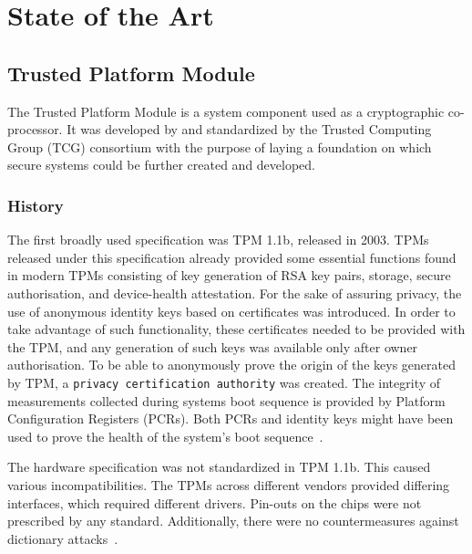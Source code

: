 \chapter{State of the Art}

\section{Trusted Platform Module}
The Trusted Platform Module is a system component used as a cryptographic co-processor. It was developed by and standardized by the Trusted Computing Group (TCG) consortium with the purpose of laying a foundation on which secure systems could be further created and developed. 

\subsection{History}
The first broadly used specification was TPM 1.1b, released in 2003. TPMs released under this specification already provided some essential functions found in modern TPMs consisting of key generation of RSA key pairs, storage, secure authorisation, and device-health attestation. For the sake of assuring privacy, the
use of anonymous identity keys based on certificates was introduced. In order to take advantage of such
functionality, these certificates needed to be provided with the TPM, and any generation of such keys was available only after owner authorisation. To be able to anonymously prove the origin of the keys generated
by TPM, a \texttt{privacy certification authority} was created. The integrity of measurements collected during systems boot sequence is provided by Platform Configuration Registers (PCRs). Both PCRs and identity keys might have been used to prove the health of the system's boot sequence~\cite{arthur2015practical}.


The hardware specification was not standardized in TPM 1.1b. This caused various incompatibilities. The TPMs across different vendors provided differing interfaces, which required different drivers. Pin-outs on the chips were not prescribed by any standard. Additionally, there were no countermeasures against dictionary attacks~\cite{arthur2015practical}.

